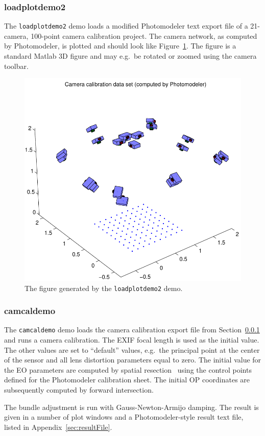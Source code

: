 \documentclass{article}
\begin{document}
\subsubsection{loadplotdemo2}
\label{sec:camcaldata}

The \verb+loadplotdemo2+ demo loads a modified Photomodeler text
export file of a 21-camera, 100-point camera calibration project. The
camera network, as computed by Photomodeler, is plotted and should
look like Figure~\ref{fig:camcalib}. The figure is a standard Matlab
3D figure and may e.g.\ be rotated or zoomed using the camera toolbar.

\begin{figure}
  \centering
  \includegraphics[width=0.6\hsize]{ill/ccam}
  \caption{The figure generated by the \texttt{loadplotdemo2} demo.}
  \label{fig:camcalib}
\end{figure}

\subsubsection{camcaldemo}

The \verb+camcaldemo+ demo loads the camera calibration export file
from Section~\ref{sec:camcaldata} and runs a camera calibration. The
EXIF focal length is used as the initial value. The other values are
set to ``default'' values, e.g.\ the principal point at the center of
the sensor and all lens distortion parameters equal to zero. The
initial value for the EO parameters are computed by spatial
resection~\citep[Chap.~11.1.3.4]{Haralick1994:Review,McGlone2004:Manual} using
the control points defined for the Photomodeler calibration sheet. The
initial OP coordinates are subsequently computed by forward
intersection.

The bundle adjustment is run with Gauss-Newton-Armijo damping. The
result is given in a number of plot windows and a Photomodeler-style
result text file, listed in Appendix~\ref{sec:resultFile}.
\end{document}

